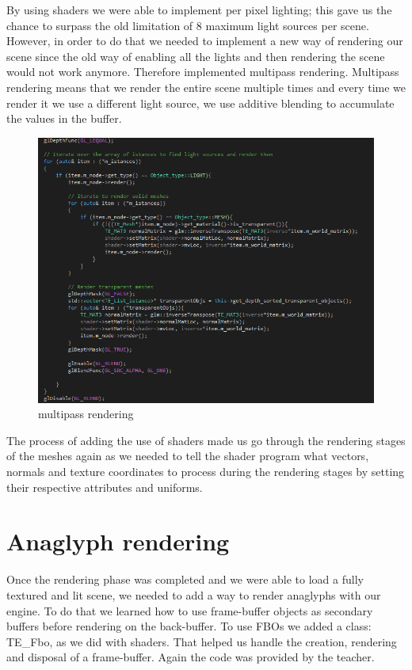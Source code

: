 \documentclass[a4paper]{report}
\begin{document}
By using shaders we were able to implement per pixel lighting; this gave us the chance to surpass the old limitation of 8 maximum light sources per scene. However, in order to do that we needed to implement a new way of rendering our scene since the old way of enabling all the lights and then rendering the scene would not work anymore. Therefore implemented multipass rendering. Multipass rendering means that we render the entire scene multiple times and every time we render it we use a different light source, we use additive blending to accumulate the values in the buffer.\\
\begin{figure}[H]
\centering
\includegraphics[scale=0.5]{multipass}
\caption{multipass rendering}
\end{figure}
The process of adding the use of shaders made us go through the rendering stages of the meshes again as we needed to tell the shader program what vectors, normals and texture coordinates to process during the rendering stages by setting their respective attributes and uniforms.

\chapter{Anaglyph rendering}

Once the rendering phase was completed and we were able to load a fully textured and lit scene, we needed to add a way to render anaglyphs with our engine. To do that we learned how to use frame-buffer objects as secondary buffers before rendering on the back-buffer. To use FBOs we added a class: TE\_Fbo, as we did with shaders. That helped us handle the creation, rendering and disposal of a frame-buffer. Again the code was provided by the teacher. 
\end{document}
